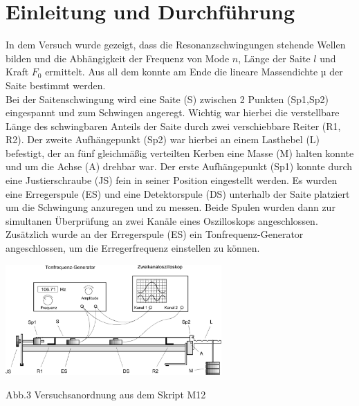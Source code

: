 \documentclass[a4paper,twocolumn]{scrartcl}
\begin{document}
  
\section*{Einleitung und Durchführung}
In dem Versuch wurde gezeigt, dass die Resonanzschwingungen stehende Wellen bilden und die Abhängigkeit der Frequenz von Mode $n$, Länge der Saite $l$ und Kraft $F_0$ ermittelt. Aus all dem konnte am Ende die lineare Massendichte $µ$ der Saite bestimmt werden.\\

Bei der Saitenschwingung wird eine Saite (S) zwischen 2 Punkten (Sp1,Sp2) eingespannt und zum Schwingen angeregt. Wichtig war hierbei die verstellbare Länge des schwingbaren Anteils der Saite durch zwei verschiebbare Reiter (R1, R2). Der zweite Aufhängepunkt (Sp2) war hierbei an einem Lasthebel (L) befestigt, der an fünf gleichmäßig verteilten Kerben eine Masse (M) halten konnte und um die Achse (A) drehbar war. Der erste Aufhängepunkt (Sp1) konnte durch eine Justierschraube (JS) fein in seiner Position eingestellt werden. Es wurden eine Erregerspule (ES) und eine Detektorspule (DS) unterhalb der Saite platziert um die Schwingung anzuregen und zu messen. Beide Spulen wurden dann zur simultanen Überprüfung an zwei Kanäle eines Oszilloskops angeschlossen. Zusätzlich wurde an der Erregerspule (ES) ein Tonfrequenz-Generator angeschlossen, um die Erregerfrequenz einstellen zu können.

\includegraphics[width=3.25in]{Aufbau.png}
\caption{Abb.3 Versuchsanordnung aus dem Skript M12}
\end{document}
